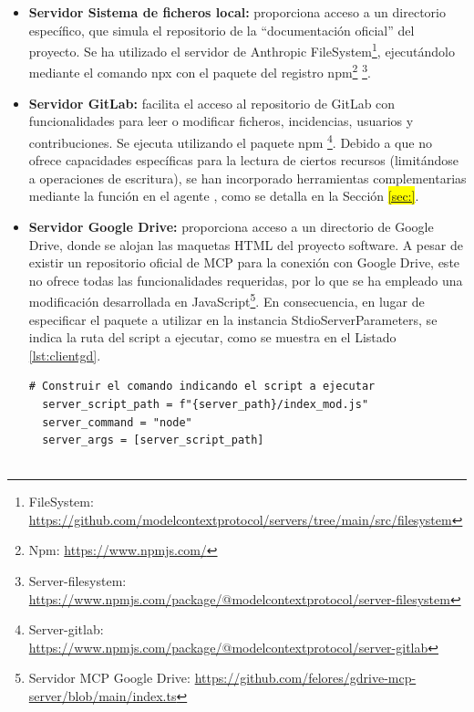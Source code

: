 \begin{itemize}
  \item\textbf{Servidor Sistema de ficheros local: }proporciona acceso a un directorio específico, que simula el repositorio de la ``documentación oficial'' del proyecto. Se ha utilizado el servidor de Anthropic FileSystem\footnote{FileSystem: \url{https://github.com/modelcontextprotocol/servers/tree/main/src/filesystem}}, ejecutándolo mediante el comando npx con el paquete del registro npm\footnote{Npm: \url{https://www.npmjs.com/}} \footnote{Server-filesystem: \url{https://www.npmjs.com/package/@modelcontextprotocol/server-filesystem}}.

  \label{sec:gitlab_mcp}
  \item\textbf{Servidor GitLab: }facilita el acceso al repositorio de GitLab con funcionalidades para leer o modificar ficheros, incidencias, usuarios y contribuciones. Se ejecuta utilizando el paquete npm \footnote{Server-gitlab: \url{https://www.npmjs.com/package/@modelcontextprotocol/server-gitlab}}. Debido a que no ofrece capacidades específicas para la lectura de ciertos recursos (limitándose a operaciones de escritura), se han incorporado herramientas complementarias mediante la función  en el agente , como se detalla en la Sección \colorbox{yellow}{\ref{sec:}}.

  \item\textbf{Servidor Google Drive: }proporciona acceso a un directorio de Google Drive, donde se alojan las maquetas HTML del proyecto software. A pesar de existir un repositorio oficial de MCP para la conexión con Google Drive, este no ofrece todas las funcionalidades requeridas, por lo que se ha empleado una modificación desarrollada en JavaScript\footnote{Servidor MCP Google Drive: \url{https://github.com/felores/gdrive-mcp-server/blob/main/index.ts}}. En consecuencia, en lugar de especificar el paquete a utilizar en la instancia StdioServerParameters, se indica la ruta del script a ejecutar, como se muestra en el Listado \ref{lst:clientgd}.

    \begin{lstlisting}[caption={\protect\opus{mcp_multi_client.py}: StdioServerParameters para el servidor MCP de Google Drive},label={lst:clientgd}]
  # Construir el comando indicando el script a ejecutar
  server_script_path = f"{server_path}/index_mod.js"
  server_command = "node"
  server_args = [server_script_path]


\end{lstlisting}
\end{itemize}
